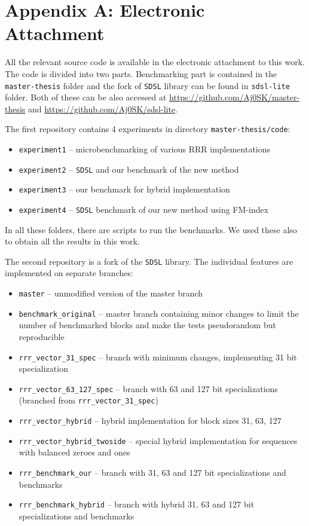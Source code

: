 \chapter*{Appendix A: Electronic Attachment}
\label{kap:kapAppendixA}

All the relevant source code is available in the electronic attachment to this work.
The code is divided into two parts. Benchmarking part is contained in the \verb!master-thesis!
folder and the fork of \texttt{SDSL} library can be found in \verb!sdsl-lite! folder.
Both of these can be also accessed at \url{https://github.com/Aj0SK/master-thesis} and
\url{https://github.com/Aj0SK/sdsl-lite}.

The first repository contains 4 experiments in directory \texttt{master-thesis/code}:
\begin{itemize}
    \item \texttt{experiment1} -- microbenchmarking of various RRR implementations
    \item \texttt{experiment2} -- \texttt{SDSL} and our benchmark of the new method
    \item \texttt{experiment3} -- our benchmark for hybrid implementation
    \item \texttt{experiment4} -- \texttt{SDSL} benchmark of our new method using FM-index
\end{itemize}
In all these folders, there are scripts to run the benchmarks. We used these also to obtain
all the results in this work. 

The second repository is a fork of the \texttt{SDSL} library. The individual features are implemented
on separate branches:
\begin{itemize}
    \item \texttt{master} -- unmodified version of the master branch
    \item \texttt{benchmark\_original} -- master branch containing minor changes
        to limit the number of benchmarked blocks and make the tests pseudorandom but reproducible
    \item \texttt{rrr\_vector\_31\_spec} -- branch with minimum changes, implementing 31 bit specialization
    \item \texttt{rrr\_vector\_63\_127\_spec} -- branch with 63 and 127 bit specializations (branched from \texttt{rrr\_vector\_31\_spec})
    \item \texttt{rrr\_vector\_hybrid} -- hybrid implementation for block sizes 31, 63, 127
    \item \texttt{rrr\_vector\_hybrid\_twoside} -- special hybrid implementation for sequences with balanced zeroes and ones
    \item \texttt{rrr\_benchmark\_our} -- branch with 31, 63 and 127 bit specializations and benchmarks
    \item \texttt{rrr\_benchmark\_hybrid} -- branch with hybrid 31, 63 and 127 bit specializations and benchmarks
\end{itemize}

